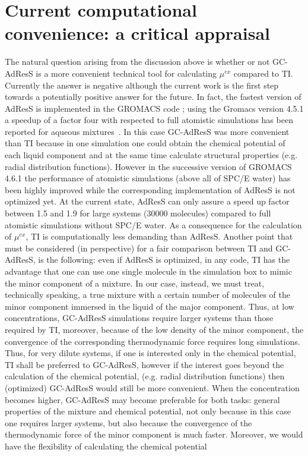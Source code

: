 \documentclass[a4paper,preprint,unsortedaddress]{revtex4-1}
\begin{document}
\section{Current computational convenience: a critical appraisal}
The natural question arising from the discussion above is whether or not GC-AdResS is a more convenient technical tool for calculating $\mu^{ex}$ compared to TI.
Currently the answer is negative although the current work is the first step towards a potentially positive answer for the future. In fact, the fastest version of AdResS is implemented in the GROMACS code \cite{gromacs}; using the Gromacs version 4.5.1 a speedup of a factor four with respected to full atomistic simulations has been reported for aqueous mixtures~\cite{debashish1,nico-debashish}. In this case GC-AdResS was more convenient than TI because in one simulation one could obtain the chemical potential of each liquid component and at the same time calculate structural properties (e.g. radial distribution functions). However in the successive version of GROMACS 4.6.1 the performance of atomistic simulations (above all of SPC/E water) has been highly improved while the corresponding implementation of AdResS is not optimized yet. At the current state, AdResS can only assure a speed up factor between 1.5 and 1.9 for large systems (30000 molecules) compared to full atomistic simulations without SPC/E water. As a consequence for the calculation of $\mu^{ex}$, TI is computationally less demanding than AdResS. Another point that must be considered (in perspective) for a fair comparison between TI and GC-AdResS, is the following: even if AdResS is optimized, in any code, TI has the advantage that one can use one single molecule in the simulation box to mimic the minor component of a mixture. In our case, instead, we must treat, technically speaking, a true mixture with a certain number of molecules of the minor component immersed in the liquid of the major component. Thus, at low concentrations, GC-AdResS simulations require larger systems than those required by TI, moreover, because of the low density of the minor component, the convergence of the corresponding thermodynamic force requires long simulations. 
Thus, for very dilute systems, if one is interested only in the chemical potential, TI shall be preferred to GC-AdResS, however if the interest goes beyond the calculation of the chemical potential, (e.g. radial distribution functions) then (optimized) GC-AdResS would still be more convenient.
When the concentration becomes higher, GC-AdResS may become preferable for both tasks: general properties of the mixture and chemical potential, not only because in this case one requires larger systems, but also because the convergence of the thermodynamic force of the minor component is much faster. Moreover, we would have the flexibility of calculating the chemical potential
\end{document}
